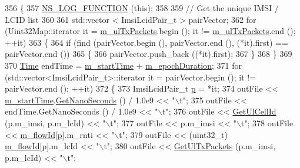 \begin{DoxyCode}
356 \{
357   \hyperlink{log-macros-disabled_8h_a90b90d5bad1f39cb1b64923ea94c0761}{NS\_LOG\_FUNCTION} (\textcolor{keyword}{this});
358 
359   \textcolor{comment}{// Get the unique IMSI / LCID list}
360 
361   std::vector < ImsiLcidPair\_t > pairVector;
362   \textcolor{keywordflow}{for} (Uint32Map::iterator it = \hyperlink{classns3_1_1MmWaveBearerStatsCalculator_a71ec089c616f65f0fba9bb10ca6c1d66}{m\_ulTxPackets}.begin (); it != 
      \hyperlink{classns3_1_1MmWaveBearerStatsCalculator_a71ec089c616f65f0fba9bb10ca6c1d66}{m\_ulTxPackets}.end (); ++it)
363     \{
364       \textcolor{keywordflow}{if} (find (pairVector.begin (), pairVector.end (), (*it).first) == pairVector.end ())
365         \{
366           pairVector.push\_back ((*it).first);
367         \}
368     \}
369 
370   \hyperlink{namespacens3_1_1TracedValueCallback_a7ffd3e7c142ffe7c8a1d2db9b8de38ec}{Time} endTime = \hyperlink{classns3_1_1MmWaveBearerStatsCalculator_ab4b3e7ac6ccb03b3e93e0c9b197e91b2}{m\_startTime} + \hyperlink{classns3_1_1MmWaveBearerStatsCalculator_a767bc28726f63f18fa581cd97c4958c4}{m\_epochDuration};
371   \textcolor{keywordflow}{for} (std::vector<ImsiLcidPair\_t>::iterator it = pairVector.begin (); it != pairVector.end (); ++it)
372     \{
373       ImsiLcidPair\_t \hyperlink{lte__link__budget_8m_ac9de518908a968428863f829398a4e62}{p} = *it;
374       outFile << \hyperlink{classns3_1_1MmWaveBearerStatsCalculator_ab4b3e7ac6ccb03b3e93e0c9b197e91b2}{m\_startTime}.\hyperlink{classns3_1_1Time_a2fdb7bf0e1f5cd93b6149cb37bbb7f08}{GetNanoSeconds} () / 1.0e9 << \textcolor{stringliteral}{"\(\backslash\)t"};
375       outFile << endTime.GetNanoSeconds () / 1.0e9 << \textcolor{stringliteral}{"\(\backslash\)t"};
376       outFile << \hyperlink{classns3_1_1MmWaveBearerStatsCalculator_a53c4cf1c9091c9f0f37d0134adda6396}{GetUlCellId} (p.m\_imsi, p.m\_lcId) << \textcolor{stringliteral}{"\(\backslash\)t"};
377       outFile << p.m\_imsi << \textcolor{stringliteral}{"\(\backslash\)t"};
378       outFile << \hyperlink{classns3_1_1MmWaveBearerStatsCalculator_ac2cfada765e9b57387e6831ec6eef162}{m\_flowId}[\hyperlink{lte__link__budget_8m_ac9de518908a968428863f829398a4e62}{p}].m\_rnti << \textcolor{stringliteral}{"\(\backslash\)t"};
379       outFile << (uint32\_t) \hyperlink{classns3_1_1MmWaveBearerStatsCalculator_ac2cfada765e9b57387e6831ec6eef162}{m\_flowId}[p].m\_lcId << \textcolor{stringliteral}{"\(\backslash\)t"};
380       outFile << \hyperlink{classns3_1_1MmWaveBearerStatsCalculator_a46ac422cb73a1783dd612dcb451c1826}{GetUlTxPackets} (p.m\_imsi, p.m\_lcId) << \textcolor{stringliteral}{"\(\backslash\)t"};

\end{DoxyCode}

